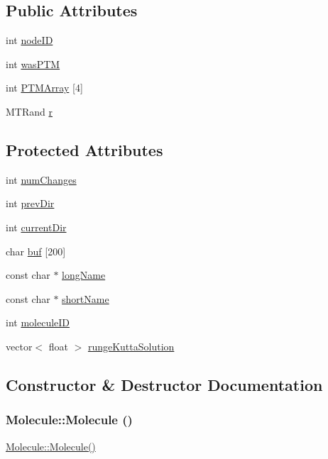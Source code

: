 \subsection*{Public Attributes}
\begin{DoxyCompactItemize}
\item 
int \hyperlink{classMolecule_a4eafa2831869e116f64c86987f1cac81}{nodeID}
\item 
int \hyperlink{classMolecule_a134dd5ffa71953792912c7b0cca01405}{wasPTM}
\item 
int \hyperlink{classMolecule_ae6aff39305dd77531ea5a213b6f2b1c5}{PTMArray} \mbox{[}4\mbox{]}
\item 
MTRand \hyperlink{classMolecule_af036bbaa1f3ec537d3711ae3242d3074}{r}
\end{DoxyCompactItemize}
\subsection*{Protected Attributes}
\begin{DoxyCompactItemize}
\item 
int \hyperlink{classMolecule_a526a58eb943156887bb75b24bdb2b8a0}{numChanges}
\item 
int \hyperlink{classMolecule_acefb24656feeb161148e9594db6ada0b}{prevDir}
\item 
int \hyperlink{classMolecule_a4cd5591c0a8c07ceec922c4f2e8f295c}{currentDir}
\item 
char \hyperlink{classMolecule_a5b6f24dea7138830541e938e2eed707a}{buf} \mbox{[}200\mbox{]}
\item 
const char $\ast$ \hyperlink{classMolecule_a4ac09eefeba07dcb455014acc1ad00c9}{longName}
\item 
const char $\ast$ \hyperlink{classMolecule_ae79f60ef35ffcb500e91013f59563e03}{shortName}
\item 
int \hyperlink{classMolecule_a563a9a295191833b51660f77749e3628}{moleculeID}
\item 
vector$<$ float $>$ \hyperlink{classMolecule_a3e3be6cd7b1286e8d8d489642ab19641}{rungeKuttaSolution}
\end{DoxyCompactItemize}


\subsection{Constructor \& Destructor Documentation}
\hypertarget{classMolecule_a7e7d290ae641518ad4c4d5303b519d0f}{
\subsubsection[{Molecule}]{\setlength{\rightskip}{0pt plus 5cm}Molecule::Molecule ()}}
\label{classMolecule_a7e7d290ae641518ad4c4d5303b519d0f}
\hyperlink{classMolecule_a7e7d290ae641518ad4c4d5303b519d0f}{Molecule::Molecule()}

